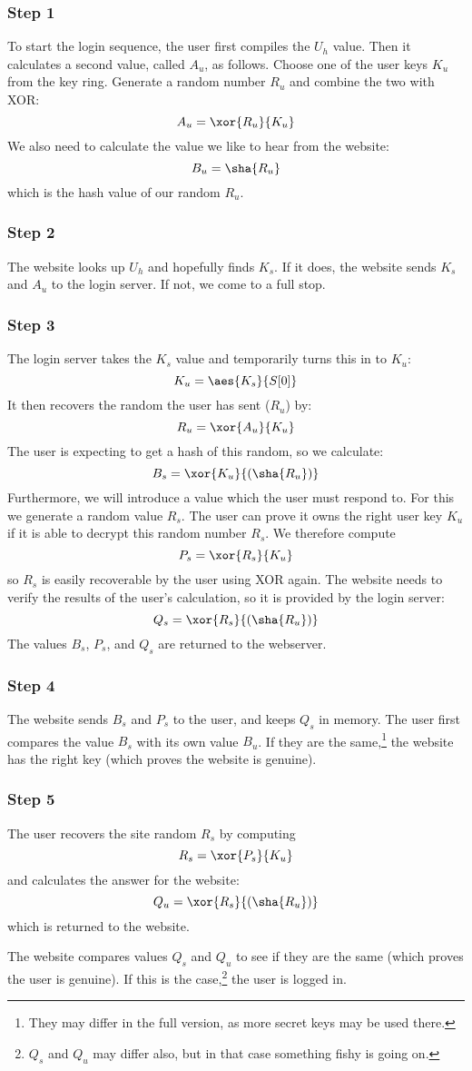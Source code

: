 \subsubsection{Step 1}
To start the login sequence,
the user first compiles the $U_h$ value.
Then it calculates a second value, called $A_u$, as follows.
Choose one of the user keys $K_u$ from the key ring.
Generate a random number $R_u$ and combine the two with XOR:
\[A_u=\xor{R_u}{K_u}\]
We also need to calculate the value we like to hear from the website:
\[B_u=\sha{R_u}\]
which is the hash value of our random $R_u$.
\subsubsection{Step 2}
The website looks up $U_h$ and hopefully finds $K_s$.
If it does, the website sends $K_s$ and $A_u$ to the login server.
If not, we come to a full stop.
\subsubsection{Step 3}
The login server takes the $K_s$ value and temporarily turns this in to $K_u$:
\[K_u=\aes{K_s}{S[0]}\]
It then recovers the random the user has sent ($R_u$) by:
\[R_u=\xor{A_u}{K_u}\]
The user is expecting to get a hash of this random, so we calculate:
\[B_s=\xor{K_u}{(\sha{R_u})}\]
Furthermore, we will introduce a value which the user must respond to.
For this we generate a random value $R_s$.
The user can prove it owns the right user key $K_u$ if it is able to decrypt this random number $R_s$.
We therefore compute
\[P_s=\xor{R_s}{K_u}\]
so $R_s$ is easily recoverable by the user using XOR again.
The website needs to verify the results of the user's calculation,
so it is provided by the login server:
\[Q_s=\xor{R_s}{(\sha{R_u})}\]
The values $B_s$, $P_s$, and $Q_s$ are returned to the webserver.
\subsubsection{Step 4}
The website sends $B_s$ and $P_s$ to the user, and keeps $Q_s$ in memory.
The user first compares the value $B_s$ with its own value $B_u$.
If they are the same,\footnote{They may differ in the full version, as more secret keys may be used there.}
the website has the right key
(which proves the website is genuine).
\subsubsection{Step 5}
The user recovers the site random $R_s$ by computing
\[R_s=\xor{P_s}{K_u}\]
and calculates the answer for the website:
\[Q_u=\xor{R_s}{(\sha{R_u})}\]
which is returned to the website.
\par
The website compares values $Q_s$ and $Q_u$ to see if they are the same
(which proves the user is genuine).
If this is the case,\footnote{$Q_s$ and $Q_u$ may differ also, but in that case something fishy is going on.}
the user is logged in.
